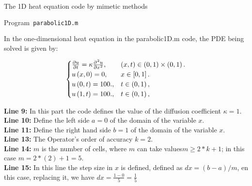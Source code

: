 The 1D heat equation code by mimetic methods


\begin{listing}[ht!]
    \tiny
    \centering
    \caption{Program~\texttt{parabolic1D.m}}
    \label{code:parabolic1D.m}
\end{listing}


In the one-dimensional heat equation in the parabolic1D.m code, the PDE being solved is given by:


\begin{equation}\label{eq:IBVPheat1d}
    \begin{cases}
        \diffp{u}{t}=
        \kappa\diffp[2]{u}{x},
                                 & \left(x,t\right)\in
        \left(0,1 \right)\times\left(0, 1 \right).     \\
        u\left(x,0\right)= 0,
                                 & x\in
        \left[0,1\right].                              \\
        u\left(0,t\right)= 100., & t\in
        \left(0,1 \right),                             \\
        u\left(1,t\right)= 100.,
                                 & t\in
        \left(0, 1\right),
    \end{cases}
\end{equation}


\textbf{Line 9:} In this part the code defines the value of the diffusion coefficient $\kappa =1$.\\

\textbf{Line 10:} Define the left side $a= 0$ of the domain of the variable $x$.\\

\textbf{Line 11:} Define the right hand side $b= 1$ of the domain of the variable $x$.\\

\textbf{Line 13:} The Operator's order of accuracy $k = 2$.\\

\textbf{Line 14:} $m$ is the number of cells, where $m$ can take values ​​$m \geq 2*k+1$; in this case $m=2*(2)+1=5$.\\

\textbf{Line 15:} In this line the step size in $x$ is defined, defined as $dx=(b-a)/m$, en this case, replacing it, we have $dx =\frac{1-0}{5} =\frac{1}{5}$ \\


